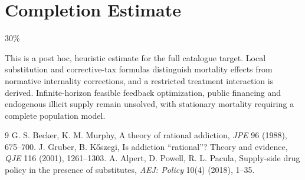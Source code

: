 \documentclass[11pt]{article}
\theoremstyle{definition}
\begin{document}
\section{Completion Estimate}
30\%

This is a post hoc, heuristic estimate for the full catalogue target.
Local substitution and corrective-tax formulas distinguish mortality effects from normative internality corrections, and a restricted treatment interaction is derived. Infinite-horizon feasible feedback optimization, public financing and endogenous illicit supply remain unsolved, with stationary mortality requiring a complete population model.

\begin{thebibliography}{9}
 G. S. Becker, K. M. Murphy, A theory of rational addiction, \emph{JPE} 96 (1988), 675--700.
 J. Gruber, B. K\H{o}szegi, Is addiction ``rational''? Theory and evidence, \emph{QJE} 116 (2001), 1261--1303.
 A. Alpert, D. Powell, R. L. Pacula, Supply-side drug policy in the presence of substitutes, \emph{AEJ: Policy} 10(4) (2018), 1--35.
\end{thebibliography}
\end{document}

